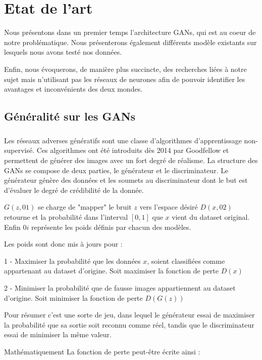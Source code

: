 \documentclass[a4paper, 12pt]{book}
\begin{document}
\chapter{Etat de l'art}
 
Nous présentons dans un premier temps l'architecture GANs, qui est au coeur de notre problématique. Nous présenterons également différents modèle existants sur lesquels nous avons testé nos données.

Enfin, nous évoquerons, de manière plus succincte, des recherches liées à notre sujet mais n'utilisant pas les réseaux de neurones afin de pouvoir identifier les avantages et inconvénients des deux mondes. 


\section{Généralité sur les GANs}

\paragraph{}
Les réseaux adverses génératifs sont une classe d'algorithmes d'apprentissage non-supervisé. Ces algorithmes ont été introduits dès 2014 par Goodfellow \cite{goodfellow2014generative} et permettent de générer des images avec un fort degré de réalisme. La structure des GANs se compose de deux parties, le générateur et le discriminateur. Le générateur génère des données et les soumets au discriminateur dont le but est d'évaluer le degré de crédibilité de la donnée. 


$G(z, 01)$ se charge de "mapper" le bruit $z$ vers l'espace désiré
$D(x, 02)$ retourne et la probabilité dans l'interval $[0,1]$ que $x$ vient du dataset original. Enfin $0i$ représente les poids définis par chacun des modèles.

Les poids sont donc mis à jours pour : 

1 - Maximiser la probabilité que les données $x$, soient classifiées comme appartenant au dataset d'origine. Soit maximiser la fonction de perte $D(x)$

2 - Minimiser la probabilité que de fausse images appartiennent au dataset d'origine. Soit minimiser la fonction de perte $D(G(z))$


Pour résumer c'est une sorte de jeu, dans lequel le générateur essai de maximiser la probabilité que sa sortie soit reconnu comme réel, tandis que le discriminateur essai de minimiser la même valeur.

Mathématiquement La fonction de perte peut-être écrite ainsi : 
\end{document}
